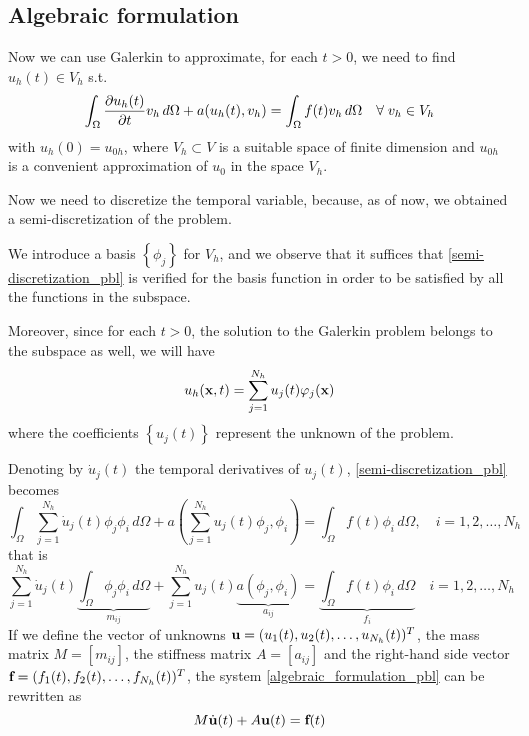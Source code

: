 \subsection{Algebraic formulation}
Now we can use Galerkin to approximate, for each \(t > 0\), we need to find \(u_h(t) \in V_h\) s.t. 
\begin{equation}
    \int_\Omega \partialderivative{u_h(t)}{t} v_h \, d\Omega + a(u_h(t), v_h) = \int_\Omega f(t)v_h \, d\Omega \quad \forall \; v_h \in V_h
\label{semi-discretization_pbl}
\end{equation}
with \(u_h(0) = u_{0h}\), where \(V_h \subset V\) is a suitable space of finite dimension and \(u_{0h}\) is a convenient approximation of \(u_0\) in the space \(V_h\).

Now we need to discretize the temporal variable, because, as of now, we obtained a semi-discretization of the problem.

We introduce a basis \(\left\{ \phi_j \right\}\) for \(V_h\), and we observe that it suffices that \eqref{semi-discretization_pbl} is verified for the basis function in order to be satisfied by all the functions in the subspace. 

Moreover, since for each \(t > 0\), the solution to the Galerkin problem belongs to the subspace as well, we will have
\[
    u_h(\textbf{x}, t) = \sum_{j=1}^{N_h} u_j(t)\varphi_j(\textbf{x})
\]
where the coefficients \(\left\{ u_j(t) \right\}\) represent the unknown of the problem. 

Denoting by \(\dot{u}_j(t)\) the temporal derivatives of \(u_j(t)\), \eqref{semi-discretization_pbl} becomes
\[
    \int_\Omega \sum_{j=1}^{N_h} \dot{u}_j(t) \phi_j\phi_i \, d\Omega + a\left( \sum_{j=1}^{N_h} u_j(t)\phi_j, \phi_i \right) = \int_\Omega f(t)\phi_i \, d\Omega, \quad i = 1,2,\ldots, N_h
\]
that is 
\begin{equation}
    \sum_{j=1}^{N_h} \dot{u}_j(t) \underbrace{\int_\Omega \phi_j \phi_i \, d\Omega}_{m_{ij}} + \sum_{j=1}^{N_h} u_j(t) \underbrace{a(\phi_j, \phi_i)}_{a_{ij}} = \underbrace{\int_\Omega f(t)\phi_i \, d\Omega}_{f_i} \quad i = 1,2,\ldots, N_h
    \label{algebraic_formulation_pbl}
\end{equation}
If we define the vector of unknowns \(\textbf{u} = (u_1(t), u_2(t), \ldots, u_{N_h}(t))^T\), the mass matrix \(M = [m_{ij}]\), the stiffness matrix \(A = [a_{ij}]\) and the right-hand side vector \(\textbf{f} = (f_1(t), f_2(t), \ldots, f_{N_h}(t))^T\), the system \eqref{algebraic_formulation_pbl} can be rewritten as 
\[
    M\dot{\textbf{u}}(t) + A\textbf{u}(t) = \textbf{f}(t)
\]
